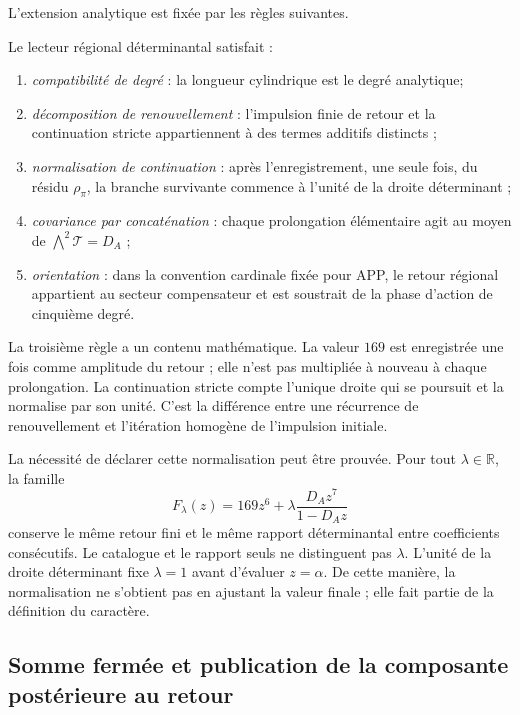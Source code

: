 L'extension analytique est fixée par les règles suivantes.

\begin{definition}
\label{p3-20260826:def:lector-regional-determinantal}
Le lecteur régional déterminantal satisfait :
\begin{enumerate}
  \item \emph{compatibilité de degré} : la longueur cylindrique est le degré
  analytique;
  \item \emph{décomposition de renouvellement} : l'impulsion finie de retour et
  la continuation stricte appartiennent à des termes additifs distincts ;
  \item \emph{normalisation de continuation} : après l'enregistrement, une seule
  fois, du résidu \(\rho_\pi\), la branche survivante commence à l'unité de
  la droite déterminant ;
  \item \emph{covariance par concaténation} : chaque prolongation élémentaire
  agit au moyen de
  \(\bigwedge^2\mathcal T=D_A\) ;
  \item \emph{orientation} : dans la convention cardinale fixée pour APP, le retour régional appartient au secteur compensateur et est soustrait de la phase d'action de cinquième degré.
\end{enumerate}
\end{definition}

La troisième règle a un contenu mathématique. La valeur \(169\) est enregistrée
une fois comme amplitude du retour ; elle n'est pas multipliée à nouveau à chaque
prolongation. La continuation stricte compte l'unique droite qui se poursuit et
la normalise par son unité. C'est la différence entre une récurrence de
renouvellement et l'itération homogène de l'impulsion initiale.

La nécessité de déclarer cette normalisation peut être prouvée. Pour tout
\(\lambda\in\mathbb R\), la famille
\[
F_\lambda(z)
=169z^6+\lambda\frac{D_Az^7}{1-D_Az}
\]
conserve le même retour fini et le même rapport déterminantal entre
coefficients consécutifs. Le catalogue et le rapport seuls ne distinguent pas
\(\lambda\). L'unité de la droite déterminant fixe
\(\lambda=1\) avant d'évaluer \(z=\alpha\). De cette manière, la normalisation
ne s'obtient pas en ajustant la valeur finale ; elle fait partie de la définition du
caractère.

\subsection{Somme fermée et publication de la composante postérieure au retour}
\label{sec:s102:c38:2:7}

